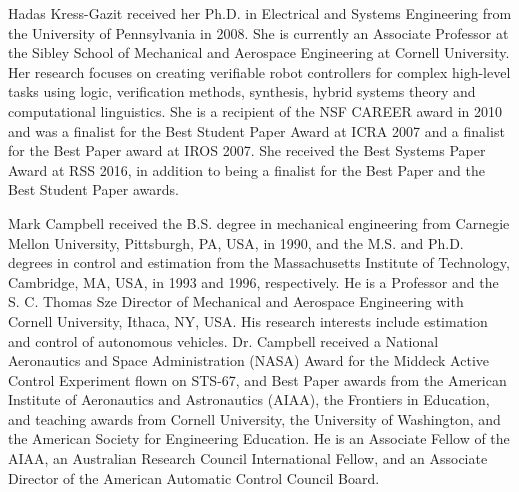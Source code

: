 \documentclass[journal]{IEEEtran}
\begin{document}
\vspace{\biovspace}
%
\begin{IEEEbiography}
{Hadas Kress-Gazit}
received her Ph.D. in Electrical and Systems Engineering from the University of Pennsylvania in 2008. She is currently an Associate Professor at the Sibley School of Mechanical and Aerospace Engineering at Cornell University. Her research focuses on creating verifiable robot controllers for complex high-level tasks using logic, verification methods, synthesis, hybrid systems theory and computational linguistics. She is a recipient of the NSF CAREER award in 2010 and was a finalist for the Best Student Paper Award at ICRA 2007 and a finalist for the Best Paper award at IROS 2007. She received the Best Systems Paper Award at RSS 2016, in addition to being a finalist for the Best Paper and the Best Student Paper awards.
\end{IEEEbiography}
\vspace{\biovspace}
%
\begin{IEEEbiography}
{Mark Campbell}
received the B.S. degree in mechanical engineering from Carnegie Mellon University, Pittsburgh, PA, USA, in 1990, and the M.S. and Ph.D. degrees in control and estimation from the Massachusetts Institute of Technology, Cambridge, MA, USA, in 1993 and 1996, respectively. He is a Professor and the S. C. Thomas Sze Director of Mechanical and Aerospace Engineering with Cornell University, Ithaca, NY, USA. His research interests include estimation and control of autonomous vehicles. Dr. Campbell  received  a  National  Aeronautics  and  Space  Administration (NASA) Award for the Middeck Active Control Experiment flown on STS-67, and Best Paper awards from the American Institute of Aeronautics and Astronautics (AIAA), the Frontiers in Education, and teaching awards from Cornell University, the University of Washington, and the American Society for Engineering Education. He is an Associate Fellow of the AIAA, an Australian Research Council International Fellow, and an Associate Director of the American Automatic Control Council Board.
\end{IEEEbiography}
%
\end{document}
